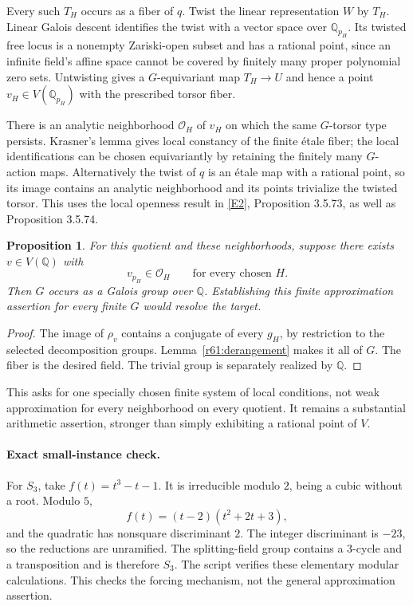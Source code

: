\documentclass[11pt,a4paper]{article}
\newcommand{\Q}{\mathbb{Q}}
\newcommand{\eref}[2]{\hyperlink{extra:#1:#2}{[E#2]}}
\newtheorem{notebookproposition}[notebooklemma]{Proposition}
\numberwithin{equation}{section}
\begin{document}
Every such $T_H$ occurs as a fiber of $q$. Twist the linear representation $W$ by $T_H$. Linear Galois descent identifies the twist with a vector space over $\Q_{p_H}$. Its twisted free locus is a nonempty Zariski-open subset and has a rational point, since an infinite field's affine space cannot be covered by finitely many proper polynomial zero sets. Untwisting gives a $G$-equivariant map $T_H\to U$ and hence a point $v_H\in V(\Q_{p_H})$ with the prescribed torsor fiber.

There is an analytic neighborhood $\mathcal O_H$ of $v_H$ on which the same $G$-torsor type persists. Krasner's lemma gives local constancy of the finite étale fiber; the local identifications can be chosen equivariantly by retaining the finitely many $G$-action maps. Alternatively the twist of $q$ is an étale map with a rational point, so its image contains an analytic neighborhood and its points trivialize the twisted torsor. This uses the local openness result in \eref{20}{2}, Proposition 3.5.73, as well as Proposition 3.5.74.

\begin{notebookproposition}\label{r61:approx}
For this quotient and these neighborhoods, suppose there exists $v\in V(\Q)$ with
\begin{equation}\label{r61:wa}
 v_{p_H}\in\mathcal O_H\qquad\text{for every chosen }H.
\end{equation}
Then $G$ occurs as a Galois group over $\Q$. Establishing this finite approximation assertion for every finite $G$ would resolve the target.
\end{notebookproposition}
\begin{proof}
The image of $\rho_v$ contains a conjugate of every $g_H$, by restriction to the selected decomposition groups. Lemma~\ref{r61:derangement} makes it all of $G$. The fiber is the desired field. The trivial group is separately realized by $\Q$.
\end{proof}

This asks for one specially chosen finite system of local conditions, not weak approximation for every neighborhood on every quotient. It remains a substantial arithmetic assertion, stronger than simply exhibiting a rational point of $V$.

\paragraph{Exact small-instance check.}
For $S_3$, take $f(t)=t^3-t-1$. It is irreducible modulo $2$, being a cubic without a root. Modulo $5$,
\[
 f(t)=(t-2)(t^2+2t+3),
\]
and the quadratic has nonsquare discriminant $2$. The integer discriminant is $-23$, so the reductions are unramified. The splitting-field group contains a $3$-cycle and a transposition and is therefore $S_3$. The script verifies these elementary modular calculations. This checks the forcing mechanism, not the general approximation assertion.
\end{document}

